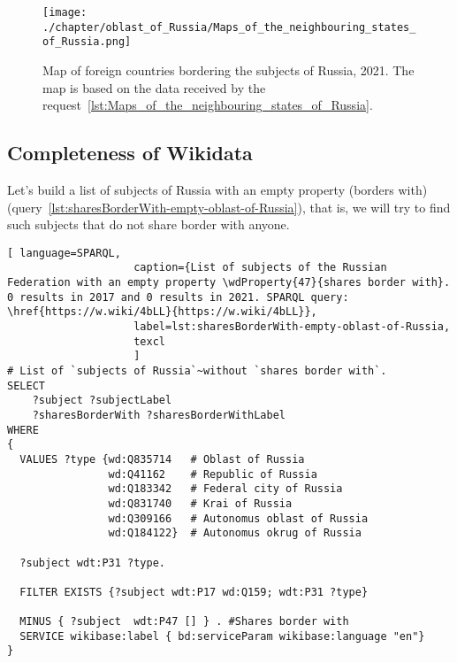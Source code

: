 \begin{figure*}[h]
	\texttt{[image: ./chapter/oblast\_of\_Russia/Maps\_of\_the\_neighbouring\_states\_of\_Russia.png]}
	\caption[Map of foreign countries bordering the subjects of Russia, 2021.]{Map of foreign countries bordering the subjects of Russia, 2021. The map is based on the data received by the request~\protect\ref{lst:Maps_of_the_neighbouring_states_of_Russia}.}%
      \label{fig:MapsoftheneighbouringstatesofRussia}%
\end{figure*}

\newpage
\subsection{Completeness of Wikidata}

Let's build a list of subjects of Russia with an empty property  (borders with) (query~\protect\ref{lst:sharesBorderWith-empty-oblast-of-Russia}), that is, we will try to find such subjects that do not share border with anyone.

\label{question:q_subjects_of_Russia_2}

\lstset{numbers=left, firstnumber=1, frame=single}
\begin{lstlisting}[ language=SPARQL, 
                    caption={List of subjects of the Russian Federation with an empty property \wdProperty{47}{shares border with}. 0 results in 2017 and 0 results in 2021. SPARQL query: \href{https://w.wiki/4bLL}{https://w.wiki/4bLL}},
                    label=lst:sharesBorderWith-empty-oblast-of-Russia,
                    texcl 
                    ]
# List of `subjects of Russia`~without `shares border with`. 
SELECT 
    ?subject ?subjectLabel 
    ?sharesBorderWith ?sharesBorderWithLabel
WHERE
{
  VALUES ?type {wd:Q835714   # Oblast of Russia
                wd:Q41162    # Republic of Russia
                wd:Q183342   # Federal city of Russia
                wd:Q831740   # Krai of Russia
                wd:Q309166   # Autonomus oblast of Russia
                wd:Q184122}  # Autonomus okrug of Russia
  
  ?subject wdt:P31 ?type.
  
  FILTER EXISTS {?subject wdt:P17 wd:Q159; wdt:P31 ?type}
  
  MINUS { ?subject  wdt:P47 [] } . #Shares border with 
  SERVICE wikibase:label { bd:serviceParam wikibase:language "en"}
}
\end{lstlisting}%

